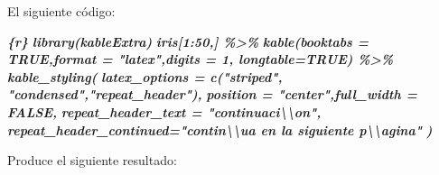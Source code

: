 \documentclass[12pt,a4paper,]{book}
\newenvironment{Shaded}{\begin{snugshade}}{\end{snugshade}}
\newcommand{\InformationTok}[1]{\textcolor[rgb]{0.56,0.35,0.01}{\textbf{\textit{#1}}}}
\numberwithin{dummy}{section}
\theoremstyle{ocrenumbox}
\theoremstyle{blacknumex}
\theoremstyle{blacknumbox}
\theoremstyle{ocrenum}
\theoremstyle{ocrenum}
\begin{document}
El siguiente código:

\begin{Shaded}
\begin{Highlighting}[]
\InformationTok{\textasciigrave{}\textasciigrave{}\textasciigrave{}\{r\}}
\InformationTok{library(kableExtra) }
\InformationTok{iris[1:50,] \%\textgreater{}\% }
\InformationTok{  kable(booktabs = TRUE,format = "latex",digits = 1, longtable=TRUE) \%\textgreater{}\%}
\InformationTok{  kable\_styling(}
\InformationTok{   latex\_options = c("striped", "condensed","repeat\_header"), }
\InformationTok{   position = "center",full\_width = FALSE,}
\InformationTok{   repeat\_header\_text = "continuaci\textbackslash{}\textbackslash{}\textquotesingle{}on", }
\InformationTok{   repeat\_header\_continued="contin\textbackslash{}\textbackslash{}\textquotesingle{}ua en la siguiente p\textbackslash{}\textbackslash{}\textquotesingle{}agina"}
\InformationTok{  )}
\InformationTok{\textasciigrave{}\textasciigrave{}\textasciigrave{}}
\end{Highlighting}
\end{Shaded}

Produce el siguiente resultado:
\end{document}
